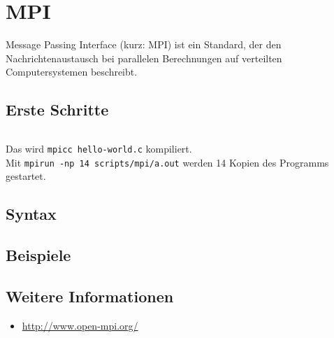 \chapter{MPI}

Message Passing Interface (kurz: MPI) ist ein Standard, 
der den Nachrichtenaustausch bei parallelen Berechnungen auf 
verteilten Computersystemen beschreibt.

\section{Erste Schritte}
\inputminted[numbersep=5pt, tabsize=4, frame=lines, label=hello-world.c]{c}{scripts/mpi/hello-world.c}

Das wird \texttt{mpicc hello-world.c} kompiliert.\\
Mit \texttt{mpirun -np 14 scripts/mpi/a.out} werden 14 Kopien des Programms
gestartet.

\section{Syntax}
\section{Beispiele}
\section{Weitere Informationen}
\begin{itemize}
    \item \url{http://www.open-mpi.org/}
\end{itemize}


